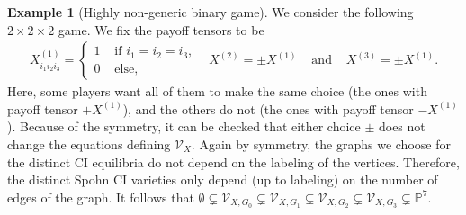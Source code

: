 \documentclass[11pt]{amsart}
\numberwithin{equation}{section}
\theoremstyle{plain}
\numberwithin{theorem}{section}
\theoremstyle{definition}
\newtheorem{example}[theorem]{Example}
\begin{document}
\begin{example}[{Highly non-generic binary game}]\label{Example $1.28$}
  We consider the following $2 \times 2 \times 2$ game. We fix the payoff tensors to be 
  \[\begin{array}{cccc}
    X^{(1)}_{i_1i_2i_3}=\left\{\begin{array}{ll}
    1 & \text{ if } i_1=i_2=i_3,\\
    0 & \text{ else,}
    \end{array}
  \right.  &X^{(2)}=\pm X^{(1)} &\text{ and }& X^{(3)}=\pm X^{(1)}.
    \end{array}
  \]
  Here, some players want all of them to make the same choice (the ones with payoff tensor $+X^{(1)}$), and the others do not (the ones with payoff tensor $-X^{(1)}$). Because of the symmetry, it can be checked that either choice $\pm$ does not change the equations defining $\mathcal V_X$. Again by symmetry, the graphs we choose for the distinct CI equilibria do not depend on the labeling of the vertices. Therefore, the distinct Spohn CI varieties only depend (up to labeling) on the number of edges of the graph. It follows that $\emptyset\subsetneq\mathcal V_{X,G_0}\subsetneq\mathcal V_{X,G_1}\subsetneq\mathcal V_{X,G_2}\subsetneq\mathcal V_{X,G_3}\subsetneq\mathbb P^7$.\\
  

\end{example}
\end{document}

